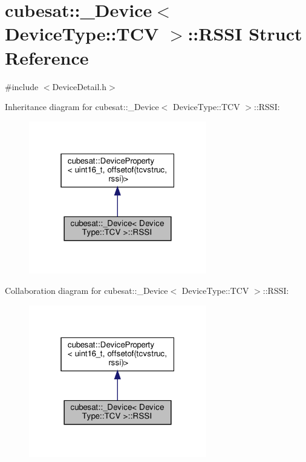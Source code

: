 \hypertarget{structcubesat_1_1__Device_3_01DeviceType_1_1TCV_01_4_1_1RSSI}{}\section{cubesat\+:\+:\+\_\+\+Device$<$ Device\+Type\+:\+:T\+CV $>$\+:\+:R\+S\+SI Struct Reference}
\label{structcubesat_1_1__Device_3_01DeviceType_1_1TCV_01_4_1_1RSSI}


{\ttfamily \#include $<$Device\+Detail.\+h$>$}



Inheritance diagram for cubesat\+:\+:\+\_\+\+Device$<$ Device\+Type\+:\+:T\+CV $>$\+:\+:R\+S\+SI\+:\nopagebreak
\begin{figure}[H]
\begin{center}
\leavevmode
\includegraphics[width=220pt]{structcubesat_1_1__Device_3_01DeviceType_1_1TCV_01_4_1_1RSSI__inherit__graph}
\end{center}
\end{figure}


Collaboration diagram for cubesat\+:\+:\+\_\+\+Device$<$ Device\+Type\+:\+:T\+CV $>$\+:\+:R\+S\+SI\+:\nopagebreak
\begin{figure}[H]
\begin{center}
\leavevmode
\includegraphics[width=220pt]{structcubesat_1_1__Device_3_01DeviceType_1_1TCV_01_4_1_1RSSI__coll__graph}
\end{center}
\end{figure}
